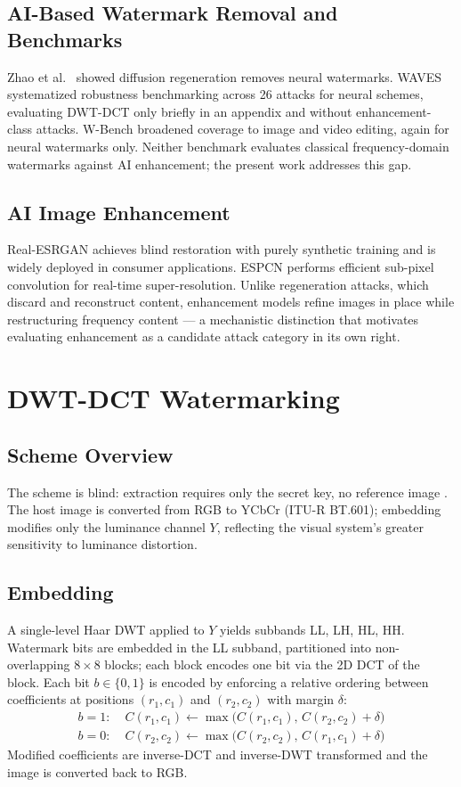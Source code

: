 \documentclass[conference]{IEEEtran}
\begin{document}
\subsection{AI-Based Watermark Removal and Benchmarks}
Zhao et al.~\cite{zhao2023} showed diffusion regeneration removes
neural watermarks. WAVES \cite{waves2024} systematized robustness
benchmarking across 26 attacks for neural schemes, evaluating DWT-DCT
only briefly in an appendix and without enhancement-class attacks.
W-Bench \cite{wbench2024} broadened coverage to image and video
editing, again for neural watermarks only. Neither benchmark evaluates
classical frequency-domain watermarks against AI enhancement; the
present work addresses this gap.

\subsection{AI Image Enhancement}
Real-ESRGAN \cite{realesrgan2021} achieves blind restoration with
purely synthetic training and is widely deployed in consumer
applications. ESPCN \cite{espcn2016} performs efficient sub-pixel
convolution for real-time super-resolution. Unlike regeneration
attacks, which discard and reconstruct content, enhancement models
refine images in place while restructuring frequency content --- a
mechanistic distinction that motivates evaluating enhancement as a
candidate attack category in its own right.

\section{DWT-DCT Watermarking}
\label{sec:background}

\subsection{Scheme Overview}
The scheme is blind: extraction requires only the secret key, no
reference image \cite{cox2007}. The host image is converted from RGB
to YCbCr (ITU-R BT.601); embedding modifies only the luminance channel
$Y$, reflecting the visual system's greater sensitivity to luminance
distortion.

\subsection{Embedding}
A single-level Haar DWT applied to $Y$ yields subbands LL, LH, HL, HH.
Watermark bits are embedded in the LL subband, partitioned into
non-overlapping $8\times8$ blocks; each block encodes one bit via the
2D DCT of the block. Each bit $b \in \{0,1\}$ is encoded by enforcing
a relative ordering between coefficients at positions $(r_1,c_1)$ and
$(r_2,c_2)$ with margin $\delta$:
\begin{align}
b=1:\; & C(r_1,c_1) \leftarrow \max\big(C(r_1,c_1),\, C(r_2,c_2)+\delta\big) \\
b=0:\; & C(r_2,c_2) \leftarrow \max\big(C(r_2,c_2),\, C(r_1,c_1)+\delta\big)
\end{align}
Modified coefficients are inverse-DCT and inverse-DWT transformed and
the image is converted back to RGB.
\end{document}
